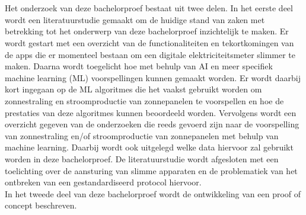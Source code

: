
\chapter{}%
\label{ch:methodologie}


Het onderzoek van deze bachelorproef bestaat uit twee delen. In het eerste deel wordt een literatuurstudie gemaakt om de huidige stand van zaken met betrekking tot het onderwerp van deze bachelorproef inzichtelijk te maken. Er wordt gestart met een overzicht van de functionaliteiten en tekortkomingen van de apps die er momenteel bestaan om een digitale elektriciteitsmeter slimmer te maken. Daarna wordt toegelicht hoe met behulp van AI en meer specifiek machine learning (ML) voorspellingen kunnen gemaakt worden. Er wordt daarbij kort ingegaan op de ML algoritmes die het vaakst gebruikt worden om zonnestraling en stroomproductie van zonnepanelen te voorspellen en hoe de prestaties van deze algoritmes kunnen beoordeeld worden. Vervolgens wordt een overzicht gegeven van de onderzoeken die reeds gevoerd zijn naar de voorspelling van zonnestraling en/of stroomproductie van zonnepanelen met behulp van machine learning. Daarbij wordt ook uitgelegd welke data hiervoor zal gebruikt worden in deze bachelorproef. De literatuurstudie wordt afgesloten met een toelichting over de aansturing van slimme apparaten en de problematiek van het ontbreken van een gestandardiseerd protocol hiervoor. \\

In het tweede deel van deze bachelorproef wordt de ontwikkeling van een proof of concept beschreven.


